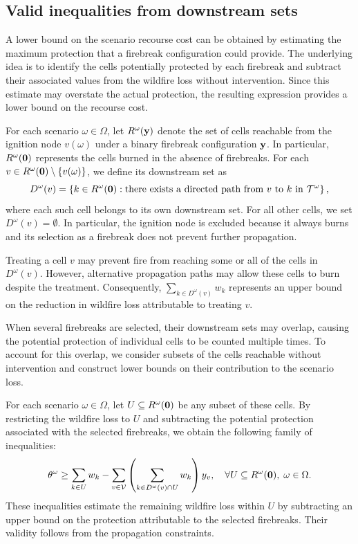 \documentclass{itor}
\begin{document}
\subsection{Valid inequalities from downstream sets}
\label{subsec:coverage_inequalities}

A lower bound on the scenario recourse cost can be obtained by estimating the maximum protection that a firebreak configuration could provide. The underlying idea is to identify the cells potentially protected by each firebreak and subtract their associated values from the wildfire loss without intervention. Since this estimate may overstate the actual protection, the resulting expression provides a lower bound on the recourse cost.

For each scenario $\omega \in \Omega$, let $R^\omega(\vb{y})$ denote the set of cells reachable from the ignition node $v(\omega)$ under a binary firebreak configuration $\vb{y}$. In particular, $R^\omega(\vb{0})$ represents the cells burned in the absence of firebreaks. For each $v \in R^\omega(\vb{0}) \setminus \{v(\omega)\}$, we define its downstream set as
%
\begin{equation}
\label{eq:downstream_set}
D^\omega(v) =
\left\{
k \in R^\omega(\vb{0}) :
\text{there exists a directed path from } v
\text{ to } k \text{ in } \mathcal{T}^\omega
\right\},
\end{equation}
%
where each such cell belongs to its own downstream set. For all other cells, we set $D^\omega(v)=\emptyset$. In particular, the ignition node is excluded because it always burns and its selection as a firebreak does not prevent further propagation.

Treating a cell $v$ may prevent fire from reaching some or all of the cells in $D^\omega(v)$. However, alternative propagation paths may allow these cells to burn despite the treatment. Consequently, $\sum_{k \in D^\omega(v)} w_k$ represents an upper bound on the reduction in wildfire loss attributable to treating $v$.

When several firebreaks are selected, their downstream sets may overlap, causing the potential protection of individual cells to be counted multiple times. To account for this overlap, we consider subsets of the cells reachable without intervention and construct lower bounds on their contribution to the scenario loss.

For each scenario $\omega \in \Omega$, let $U \subseteq R^\omega(\vb{0})$ be any subset of these cells. By restricting the wildfire loss to $U$ and subtracting the potential protection associated with the selected firebreaks, we obtain the following family of inequalities:
%
\begin{equation}
\label{eq:coverage_projected}
\theta^\omega \geq
\sum_{k \in U} w_k
-
\sum_{v \in \mathcal{V}}
\left(
\sum_{k \in D^\omega(v) \cap U} w_k
\right)y_v,
\quad
\forall U \subseteq R^\omega(\vb{0}),\;
\omega \in \Omega.
\end{equation}
%
These inequalities estimate the remaining wildfire loss within $U$ by subtracting an upper bound on the protection attributable to the selected firebreaks. Their validity follows from the propagation constraints.
\end{document}
